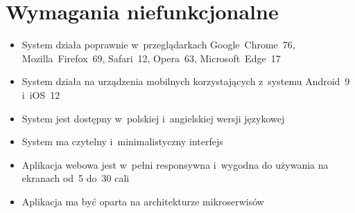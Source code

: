 \section{Wymagania niefunkcjonalne}\label{sec:nonfunctional-requirements}
\begin{itemize}
    \item System działa poprawnie w~przeglądarkach Google~Chrome~76, Mozilla~Firefox~69, Safari~12, Opera~63, Microsoft~Edge~17
    \item System działa na urządzenia mobilnych korzystających z~systemu Android~9 i~iOS~12
    \item System jest dostępny w~polskiej i~angielskiej wersji językowej
    \item System ma czytelny i~minimalistyczny interfejs
    \item Aplikacja webowa jest w~pełni responsywna i~wygodna do używania na ekranach od~5 do~30 cali
    \item Aplikacja ma być oparta na architekturze mikroserwisów
\end{itemize}
\thispagestyle{normal}

